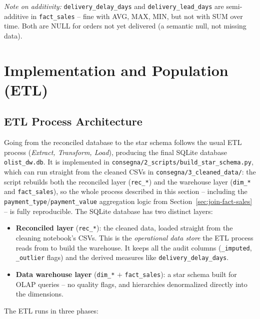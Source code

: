 \documentclass[12pt,a4paper]{article}
\begin{document}
\textit{Note on additivity:} \texttt{delivery\_delay\_days} and
\texttt{delivery\_lead\_days} are semi-additive in \texttt{fact\_sales} -- fine with
AVG, MAX, MIN, but not with SUM over time. Both are NULL for orders not yet
delivered (a semantic null, not missing data).

\section{Implementation and Population (ETL)}

\subsection{ETL Process Architecture}

Going from the reconciled database to the star schema follows the usual ETL process
(\textit{Extract, Transform, Load}), producing the final SQLite database
\texttt{olist\_dw.db}. It is implemented in
\texttt{consegna/2\_scripts/build\_star\_schema.py}, which can run straight from the
cleaned CSVs in \texttt{consegna/3\_cleaned\_data/}: the script rebuilds both the
reconciled layer (\texttt{rec\_*}) and the warehouse layer (\texttt{dim\_*} and
\texttt{fact\_sales}), so the whole process described in this section -- including
the \texttt{payment\_type}/\texttt{payment\_value} aggregation logic from
Section~\ref{sec:join-fact-sales} -- is fully reproducible.
The SQLite database has two distinct layers:

\begin{itemize}
  \item \textbf{Reconciled layer} (\texttt{rec\_*}): the cleaned data, loaded
        straight from the cleaning notebook's CSVs. This is the \textit{operational
        data store} the ETL process reads from to build the warehouse. It keeps all
        the audit columns (\texttt{\_imputed}, \texttt{\_outlier} flags) and the
        derived measures like \texttt{delivery\_delay\_days}.
  \item \textbf{Data warehouse layer} (\texttt{dim\_*} $+$ \texttt{fact\_sales}): a
        star schema built for OLAP queries -- no quality flags, and hierarchies
        denormalized directly into the dimensions.
\end{itemize}

The ETL runs in three phases:
\end{document}
